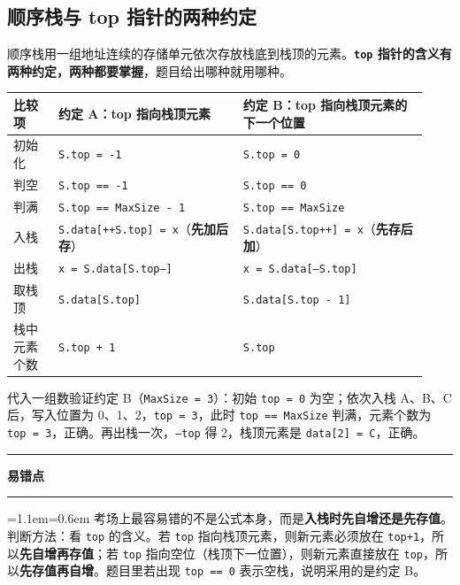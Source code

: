 \documentclass[11pt,openany,UTF8]{ctexbook}
\newcommand{\callouthead}[2]{%
  \par\addvspace{7pt}\noindent
  {\color{#1}\rule[-0.15em]{3pt}{1.05em}}\hspace{0.5em}%
  {\bfseries\color{#1}#2}\par\nobreak\vspace{-0.35em}%
  {\color{rulesep}\hrule height 0.4pt}\nobreak\vspace{0.45em}%
  \begingroup\small\setlength{\parindent}{0pt}%
  \leftskip=1.1em\rightskip=0.6em\noindent\ignorespaces}
\newcommand{\calloutend}{\par\endgroup\addvspace{7pt}}
\newenvironment{callwarn}[1]{\callouthead{warnbar}{#1}}{\calloutend}
\begin{document}
\subsection{顺序栈与 top 指针的两种约定}

顺序栈用一组地址连续的存储单元依次存放栈底到栈顶的元素。\textbf{\texttt{top} 指针的含义有两种约定，两种都要掌握}，题目给出哪种就用哪种。

\begingroup\small\setlength{\tabcolsep}{4.0pt}
\begin{longtable}{@{}L{0.1077\linewidth}L{0.4104\linewidth}L{0.4104\linewidth}@{}}
\toprule
\textbf{比较项} & \textbf{约定 A：top 指向栈顶元素} & \textbf{约定 B：top 指向栈顶元素的下一个位置} \\
\midrule
\endhead
初始化 & \texttt{S.top =\allowbreak{} -1} & \texttt{S.top =\allowbreak{} 0} \\
判空 & \texttt{S.top =\allowbreak{}=\allowbreak{} -1} & \texttt{S.top =\allowbreak{}=\allowbreak{} 0} \\
判满 & \texttt{S.top =\allowbreak{}=\allowbreak{} MaxSize - 1} & \texttt{S.top =\allowbreak{}=\allowbreak{} MaxSize} \\
入栈 & \texttt{S.data[+\allowbreak{}+\allowbreak{}S.top]\allowbreak{} =\allowbreak{} x}（\textbf{先加后存}） & \texttt{S.data[S.top+\allowbreak{}+\allowbreak{}]\allowbreak{} =\allowbreak{} x}（\textbf{先存后加}） \\
出栈 & \texttt{x =\allowbreak{} S.data[S.top--]\allowbreak{}} & \texttt{x =\allowbreak{} S.data[--S.top]\allowbreak{}} \\
取栈顶 & \texttt{S.data[S.top]\allowbreak{}} & \texttt{S.data[S.top - 1]\allowbreak{}} \\
栈中元素个数 & \texttt{S.top +\allowbreak{} 1} & \texttt{S.top} \\
\bottomrule
\end{longtable}
\endgroup

代入一组数验证约定 B（\texttt{MaxSize =\allowbreak{} 3}）：初始 \texttt{top =\allowbreak{} 0} 为空；依次入栈 A、B、C 后，写入位置为 0、1、2，\texttt{top =\allowbreak{} 3}，此时 \texttt{top =\allowbreak{}=\allowbreak{} MaxSize} 判满，元素个数为 \texttt{top =\allowbreak{} 3}，正确。再出栈一次，\texttt{--top} 得 2，栈顶元素是 \texttt{data[2]\allowbreak{} =\allowbreak{} C}，正确。

\begin{callwarn}{易错点}
考场上最容易错的不是公式本身，而是\textbf{入栈时先自增还是先存值}。判断方法：看 \texttt{top} 的含义。若 \texttt{top} 指向栈顶元素，则新元素必须放在 \texttt{top+\allowbreak{}1}，所以\textbf{先自增再存值}；若 \texttt{top} 指向空位（栈顶下一位置），则新元素直接放在 \texttt{top}，所以\textbf{先存值再自增}。题目里若出现 \texttt{top =\allowbreak{}=\allowbreak{} 0} 表示空栈，说明采用的是约定 B。

\end{callwarn}
\end{document}
